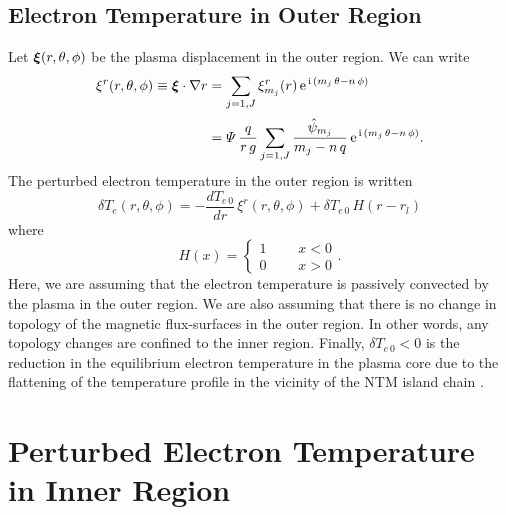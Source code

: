 \documentclass{iopjournal}
\newcommand {\bxi}{\mbox{\boldmath$\xi$}}
\begin{document}
\subsection{Electron Temperature in Outer Region}
Let $\bxi(r,\theta,\phi)$ be the plasma displacement in the outer region. We can write \cite{tear10}
\begin{align}\label{xi}
\xi^r(r,\theta,\phi)\equiv \bxi\cdot\nabla r& = \sum_{j=1,J}\xi_{m_j}^r(r)\,{\rm e}^{\,{\rm i}\,(m_j\,\theta-n\,\phi)}\nonumber\\[0.5ex]
&=
{\mit\Psi}\,\frac{q}{r\,g}\sum_{j=1,J}\frac{\hat{\psi}_{m_j}}{m_j-n\,q}\, {\rm e}^{\,{\rm i}\,(m_j\,\theta-n\,\phi)}.
\end{align}
The perturbed electron temperature  in the outer region is written
\begin{equation}
\delta T_e(r,\theta,\phi)= -\frac{dT_{e\,0}}{dr}\, \xi^r(r,\theta,\phi) + \delta T_{e\,0}\,H(r-r_{l})
\end{equation}
where
\begin{equation}
H(x)= \left\{\begin{array}{ccc}1&~~~&x<0\\0&&x>0\end{array}\right..
\end{equation}
Here, we are assuming that the electron temperature is passively convected by the plasma in the outer region. We are also
assuming that there is no change in topology of the magnetic flux-surfaces in the outer region. In other words, any topology changes are
confined to  the inner region. Finally, $\delta T_{e\,0}<0$ is the reduction in the equilibrium electron temperature in the plasma
core due to the flattening of the temperature profile in the vicinity of the NTM island chain \cite{chang}.

\section{Perturbed Electron Temperature  in Inner Region}\label{s4}
\end{document}
